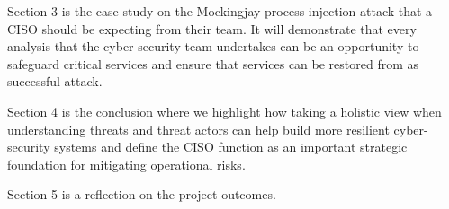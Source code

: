 
Section 3 is the case study on the Mockingjay process injection attack that a CISO should be expecting from their team.  It will demonstrate that
every analysis that the cyber-security team undertakes can be an opportunity to safeguard critical services and ensure that services can be
restored from as successful attack.




Section 4 is the conclusion where we highlight how taking a holistic view when understanding threats and threat actors can help build more
resilient cyber-security systems and define the CISO function as an important strategic foundation for mitigating operational risks.

Section 5 is a reflection on the project outcomes.

